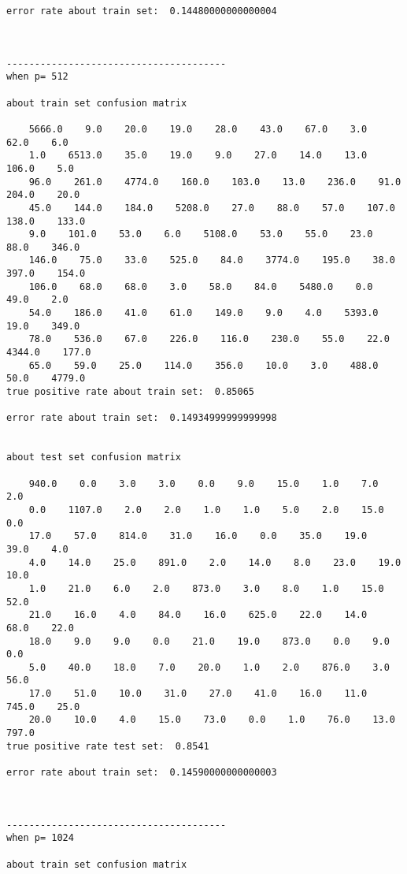 \documentclass[11pt]{article}
\begin{document}
\begin{Verbatim}[commandchars=\\\{\}]
error rate about train set:  0.14480000000000004



---------------------------------------
when p= 512

about train set confusion matrix

    5666.0    9.0    20.0    19.0    28.0    43.0    67.0    3.0    62.0    6.0
    1.0    6513.0    35.0    19.0    9.0    27.0    14.0    13.0    106.0    5.0
    96.0    261.0    4774.0    160.0    103.0    13.0    236.0    91.0    204.0    20.0
    45.0    144.0    184.0    5208.0    27.0    88.0    57.0    107.0    138.0    133.0
    9.0    101.0    53.0    6.0    5108.0    53.0    55.0    23.0    88.0    346.0
    146.0    75.0    33.0    525.0    84.0    3774.0    195.0    38.0    397.0    154.0
    106.0    68.0    68.0    3.0    58.0    84.0    5480.0    0.0    49.0    2.0
    54.0    186.0    41.0    61.0    149.0    9.0    4.0    5393.0    19.0    349.0
    78.0    536.0    67.0    226.0    116.0    230.0    55.0    22.0    4344.0    177.0
    65.0    59.0    25.0    114.0    356.0    10.0    3.0    488.0    50.0    4779.0
true positive rate about train set:  0.85065

error rate about train set:  0.14934999999999998


about test set confusion matrix

    940.0    0.0    3.0    3.0    0.0    9.0    15.0    1.0    7.0    2.0
    0.0    1107.0    2.0    2.0    1.0    1.0    5.0    2.0    15.0    0.0
    17.0    57.0    814.0    31.0    16.0    0.0    35.0    19.0    39.0    4.0
    4.0    14.0    25.0    891.0    2.0    14.0    8.0    23.0    19.0    10.0
    1.0    21.0    6.0    2.0    873.0    3.0    8.0    1.0    15.0    52.0
    21.0    16.0    4.0    84.0    16.0    625.0    22.0    14.0    68.0    22.0
    18.0    9.0    9.0    0.0    21.0    19.0    873.0    0.0    9.0    0.0
    5.0    40.0    18.0    7.0    20.0    1.0    2.0    876.0    3.0    56.0
    17.0    51.0    10.0    31.0    27.0    41.0    16.0    11.0    745.0    25.0
    20.0    10.0    4.0    15.0    73.0    0.0    1.0    76.0    13.0    797.0
true positive rate test set:  0.8541

error rate about train set:  0.14590000000000003



---------------------------------------
when p= 1024

about train set confusion matrix


\end{Verbatim}
\end{document}
